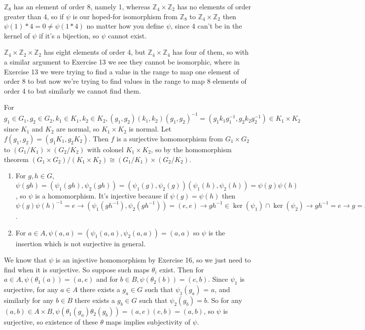 \documentclass[11pt, oneside]{article}   	%
\newcommand{\ints}{\mathbb{Z}}
\newcommand{\inv}{^{-1}}
\newcommand{\be}{\begin{enumerate}}
\newcommand{\ee}{\end{enumerate}}
\newcommand{\ra}{\rightarrow}
\begin{document}
\item $\ints_8$ has an element of order 8, namely 1, whereas $\ints_4 \times \ints_2$ has no elements of order greater than 4, so if $\psi$ is our hoped-for isomorphism from $\ints_8$ to $\ints_4 \times \ints_2$ then $\psi(1)*4 = 0 \not = \psi(1 * 4)$ no matter how you define $\psi$, since 4 can't be in the kernel of $\psi$ if it's a bijection, so $\psi$ cannot exist.
\item $\ints_4 \times \ints_2 \times \ints_2$ has eight elements of order 4, but $\ints_4 \times \ints_4$ has four of them, so with a similar argument to Exercise 13 we see they cannot be isomorphic, where in Exercise 13 we were trying to find a value in the range to map one element of order 8 to but now we're trying to find values in the range to map 8 elements of order 4 to but similarly we cannot find them.
\item For $g_1 \in G_1, g_2 \in G_2, k_1 \in K_1, k_2 \in K_2, (g_1, g_2)(k_1, k_2)(g_1, g_2)\inv = (g_1k_1g_1\inv, g_2k_2g_2\inv) \in K_1 \times K_2$ since $K_1$ and $K_2$ are normal, so $K_1 \times K_2$ is normal. Let $f(g_1, g_2) = (g_1K_1, g_2K_2)$. Then $f$ is a surjective homomorphism from $G_1 \times G_2$ to $(G_1 / K_1) \times (G_2 / K_2)$ with colonel $K_1 \times K_2$, so by the homomorphism theorem $(G_1 \times G_2) / (K_1 \times K_2) \cong (G_1 / K_1) \times (G_2 / K_2)$.
\item \be
\item For $g, h \in G$, $\psi(gh) = (\psi_1(gh), \psi_2(gh)) = (\psi_1(g), \psi_2(g))(\psi_1(h), \psi_2(h)) = \psi(g)\psi(h)$, so $\psi$ is a homomorphism. It's injective because if $\psi(g) = \psi(h)$ then $\psi(g)\psi(h)\inv = e \ra (\psi_1(gh\inv), \psi_2(gh\inv)) = (e, e) \ra gh\inv \in \ker(\psi_1) \cap \ker(\psi_2) \ra gh\inv = e \ra g = h$.
\item For $a \in A, \psi(a, a) = (\psi_1(a, a), \psi_2(a, a)) = (a, a)$ so $\psi$ is the insertion which is not surjective in general.
\ee
\item We know that $\psi$ is an injective homomorphism by Exercise 16, so we just need to find when it is surjective. So suppose such maps $\theta_i$ exist. Then for $a \in A, \psi(\theta_1(a)) = (a, e)$ and for $b \in B, \psi(\theta_2(b)) = (e, b)$. Since $\psi_1$ is surjective, for any $a \in A$ there exists a $g_a \in G$ such that $\psi_1(g_a)$ = $a$, and similarly for any $b \in B$ there exists a $g_b \in G$ such that $\psi_2(g_b) = b$. So for any $(a, b) \in A \times B, \psi(\theta_1(g_a)\theta_2(g_b)) = (a, e)(e, b) = (a, b)$, so $\psi$ is surjective, so existence of these $\theta$ maps implies subjectivity of $\psi$. \\
\end{document}
